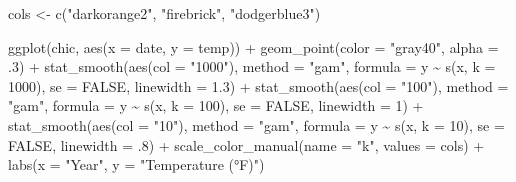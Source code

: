 \documentclass[
  letterpaper,
]{scrbook}
\newenvironment{Shaded}{\begin{snugshade}}{\end{snugshade}}
\newcommand{\AttributeTok}[1]{\textcolor[rgb]{0.40,0.45,0.13}{#1}}
\newcommand{\ConstantTok}[1]{\textcolor[rgb]{0.56,0.35,0.01}{#1}}
\newcommand{\DecValTok}[1]{\textcolor[rgb]{0.68,0.00,0.00}{#1}}
\newcommand{\FloatTok}[1]{\textcolor[rgb]{0.68,0.00,0.00}{#1}}
\newcommand{\FunctionTok}[1]{\textcolor[rgb]{0.28,0.35,0.67}{#1}}
\newcommand{\NormalTok}[1]{\textcolor[rgb]{0.00,0.23,0.31}{#1}}
\newcommand{\OtherTok}[1]{\textcolor[rgb]{0.00,0.23,0.31}{#1}}
\newcommand{\SpecialCharTok}[1]{\textcolor[rgb]{0.37,0.37,0.37}{#1}}
\newcommand{\StringTok}[1]{\textcolor[rgb]{0.13,0.47,0.30}{#1}}
\begin{document}
\begin{Shaded}
\begin{Highlighting}[]
\NormalTok{cols }\OtherTok{\textless{}{-}} \FunctionTok{c}\NormalTok{(}\StringTok{"darkorange2"}\NormalTok{, }\StringTok{"firebrick"}\NormalTok{, }\StringTok{"dodgerblue3"}\NormalTok{)}

\FunctionTok{ggplot}\NormalTok{(chic, }\FunctionTok{aes}\NormalTok{(}\AttributeTok{x =}\NormalTok{ date, }\AttributeTok{y =}\NormalTok{ temp)) }\SpecialCharTok{+}
  \FunctionTok{geom\_point}\NormalTok{(}\AttributeTok{color =} \StringTok{"gray40"}\NormalTok{, }\AttributeTok{alpha =}\NormalTok{ .}\DecValTok{3}\NormalTok{) }\SpecialCharTok{+}
  \FunctionTok{stat\_smooth}\NormalTok{(}\FunctionTok{aes}\NormalTok{(}\AttributeTok{col =} \StringTok{"1000"}\NormalTok{),}
              \AttributeTok{method =} \StringTok{"gam"}\NormalTok{,}
              \AttributeTok{formula =}\NormalTok{ y }\SpecialCharTok{\textasciitilde{}} \FunctionTok{s}\NormalTok{(x, }\AttributeTok{k =} \DecValTok{1000}\NormalTok{),}
              \AttributeTok{se =} \ConstantTok{FALSE}\NormalTok{, }\AttributeTok{linewidth =} \FloatTok{1.3}\NormalTok{) }\SpecialCharTok{+}
  \FunctionTok{stat\_smooth}\NormalTok{(}\FunctionTok{aes}\NormalTok{(}\AttributeTok{col =} \StringTok{"100"}\NormalTok{),}
              \AttributeTok{method =} \StringTok{"gam"}\NormalTok{,}
              \AttributeTok{formula =}\NormalTok{ y }\SpecialCharTok{\textasciitilde{}} \FunctionTok{s}\NormalTok{(x, }\AttributeTok{k =} \DecValTok{100}\NormalTok{),}
              \AttributeTok{se =} \ConstantTok{FALSE}\NormalTok{, }\AttributeTok{linewidth =} \DecValTok{1}\NormalTok{) }\SpecialCharTok{+}
  \FunctionTok{stat\_smooth}\NormalTok{(}\FunctionTok{aes}\NormalTok{(}\AttributeTok{col =} \StringTok{"10"}\NormalTok{),}
              \AttributeTok{method =} \StringTok{"gam"}\NormalTok{,}
              \AttributeTok{formula =}\NormalTok{ y }\SpecialCharTok{\textasciitilde{}} \FunctionTok{s}\NormalTok{(x, }\AttributeTok{k =} \DecValTok{10}\NormalTok{),}
              \AttributeTok{se =} \ConstantTok{FALSE}\NormalTok{, }\AttributeTok{linewidth =}\NormalTok{ .}\DecValTok{8}\NormalTok{) }\SpecialCharTok{+}
  \FunctionTok{scale\_color\_manual}\NormalTok{(}\AttributeTok{name =} \StringTok{"k"}\NormalTok{, }\AttributeTok{values =}\NormalTok{ cols) }\SpecialCharTok{+}
  \FunctionTok{labs}\NormalTok{(}\AttributeTok{x =} \StringTok{"Year"}\NormalTok{, }\AttributeTok{y =} \StringTok{"Temperature (°F)"}\NormalTok{)}
\end{Highlighting}
\end{Shaded}
\end{document}
